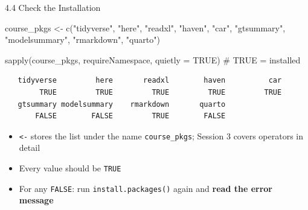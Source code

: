 \documentclass[
  ignorenonframetext,
  aspectratio=169,
]{beamer}
\newenvironment{Shaded}{\begin{snugshade}}{\end{snugshade}}
\newcommand{\AttributeTok}[1]{\textcolor[rgb]{0.40,0.45,0.13}{#1}}
\newcommand{\CommentTok}[1]{\textcolor[rgb]{0.37,0.37,0.37}{#1}}
\newcommand{\ConstantTok}[1]{\textcolor[rgb]{0.56,0.35,0.01}{#1}}
\newcommand{\FunctionTok}[1]{\textcolor[rgb]{0.28,0.35,0.67}{#1}}
\newcommand{\NormalTok}[1]{\textcolor[rgb]{0.00,0.23,0.31}{#1}}
\newcommand{\OtherTok}[1]{\textcolor[rgb]{0.00,0.23,0.31}{#1}}
\newcommand{\StringTok}[1]{\textcolor[rgb]{0.13,0.47,0.30}{#1}}
\begin{document}
\begin{frame}[fragile]{4.4 Check the Installation}
\protect{}\label{check-the-installation}
\begin{Shaded}
\begin{Highlighting}[]
\NormalTok{course\_pkgs }\OtherTok{\textless{}{-}} \FunctionTok{c}\NormalTok{(}\StringTok{"tidyverse"}\NormalTok{, }\StringTok{"here"}\NormalTok{, }\StringTok{"readxl"}\NormalTok{, }\StringTok{"haven"}\NormalTok{, }\StringTok{"car"}\NormalTok{,}
                 \StringTok{"gtsummary"}\NormalTok{, }\StringTok{"modelsummary"}\NormalTok{, }\StringTok{"rmarkdown"}\NormalTok{, }\StringTok{"quarto"}\NormalTok{)}

\FunctionTok{sapply}\NormalTok{(course\_pkgs, requireNamespace, }\AttributeTok{quietly =} \ConstantTok{TRUE}\NormalTok{)   }\CommentTok{\# TRUE = installed}
\end{Highlighting}
\end{Shaded}

\begingroup\tiny\color{darkgray}

\begin{verbatim}
   tidyverse         here       readxl        haven          car 
        TRUE         TRUE         TRUE         TRUE         TRUE 
   gtsummary modelsummary    rmarkdown       quarto 
       FALSE        FALSE         TRUE        FALSE 
\end{verbatim}

\endgroup

\begin{itemize}
\item
  \texttt{\textless{}-} stores the list under the name
  \texttt{course\_pkgs}; Session 3 covers operators in detail
\item
  Every value should be \texttt{TRUE}
\item
  For any \texttt{FALSE}: run \texttt{install.packages()} again and
  \textbf{read the error message}
\end{itemize}
\end{frame}
\end{document}
